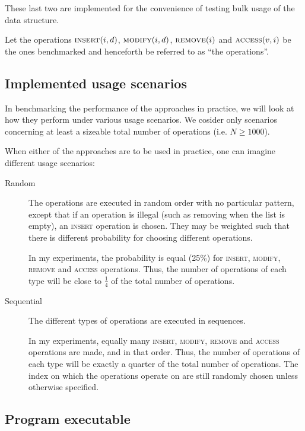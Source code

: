 These last two are implemented for the convenience of testing bulk usage of the
data structure.

Let the operations $\textsc{insert}(i,d)$, $\textsc{modify}(i,d)$,
$\textsc{remove}(i)$ and $\textsc{access}(v,i)$ be the ones benchmarked and
henceforth be referred to as ``the operations''.

\subsection{Implemented usage scenarios}

In benchmarking the performance of the approaches in practice, we will look at
how they perform under various usage scenarios. We cosider only scenarios
concerning at least a sizeable total number of operations (i.e. $N \ge 1000$).

When either of the approaches are to be used in practice, one can imagine
different usage scenarios:

\begin{description}

  \item[Random] The operations are executed in random order with no particular
  pattern, except that if an operation is illegal (such as removing when the
  list is empty), an \textsc{insert} operation is chosen. They may be weighted
  such that there is different probability for choosing different operations.
  
  In my experiments, the probability is equal (25\%) for \textsc{insert},
  \textsc{modify}, \textsc{remove} and \textsc{access} operations. Thus, the
  number of operations of each type will be close to $\frac{1}{4}$ of the total
  number of operations.

  \item[Sequential] The different types of operations are executed in sequences.
  
  In my experiments, equally many \textsc{insert}, \textsc{modify},
  \textsc{remove} and \textsc{access} operations are made, and in that order.
  Thus, the number of operations of each type will be exactly a quarter of the
  total number of operations. The index on which the operations operate on are
  still randomly chosen unless otherwise specified.

\end{description}


\subsection{Program executable}


